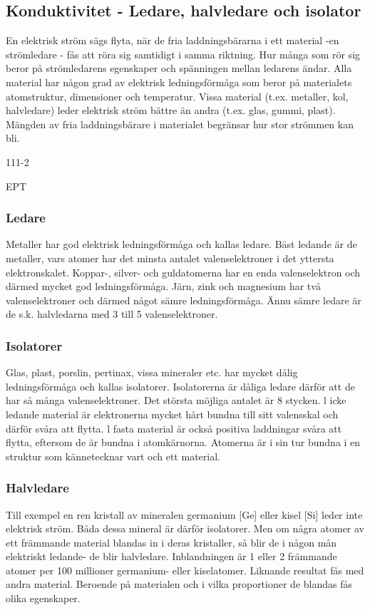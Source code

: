 \subsection{Konduktivitet - Ledare, halvledare och isolator}

En elektrisk ström sägs flyta, när de fria
laddningsbärarna i ett material -en strömledare - fås att röra sig samtidigt i samma
riktning. Hur många som rör sig beror på
strömledarens egenskaper och spänningen
mellan ledarens ändar.
Alla material har någon grad av elektrisk
ledningsförmåga som beror på materialets
atomstruktur, dimensioner och temperatur.
Vissa material (t.ex. metaller, kol, halvledare) leder elektrisk ström bättre än andra
(t.ex. glas, gummi, plast). Mängden av fria
laddningsbärare i materialet begränsar hur
stor strömmen kan bli.

111-2

EPT
\subsubsection{Ledare}
Metaller har god elektrisk ledningsförmåga
och kallas ledare. Bäst ledande är de metaller, vars atomer har det minsta antalet valenselektroner i det yttersta elektronskalet. Koppar-, silver- och guldatomerna har en enda
valenselektron och därmed mycket god ledningsförmåga. Järn, zink och magnesium
har två valenselektroner och därmed något
sämre ledningsförmåga. Ännu sämre ledare
är de s.k. halvledarna med 3 till 5 valenselektroner.

\subsubsection{Isolatorer}
Glas, plast, porslin, pertinax, vissa mineraler
etc. har mycket dålig ledningsförmåga och
kallas isolatorer. Isolatorerna är dåliga ledare därför att de har så många valenselektroner. Det största möjliga antalet är 8
stycken.
l icke ledande material är elektronerna
mycket hårt bundna till sitt valensskal och
därför svåra att flytta. l fasta material är
också positiva laddningar svåra att flytta,
eftersom de är bundna i atomkärnorna. Atomerna är i sin tur bundna i en struktur som
kännetecknar vart och ett material.

\subsubsection{Halvledare}
Till exempel en ren kristall av mineralen
germanium [Ge] eller kisel [Si] leder inte
elektrisk ström. Båda dessa mineral är därför isolatorer. Men om några atomer av ett
främmande material blandas in i deras kristaller, så blir de i någon mån elektriskt ledande- de blir halvledare. Inblandningen är
1 eller 2 främmande atomer per 100 millioner
germanium- eller kiselatomer. Liknande resultat fås med andra material. Beroende på
materialen och i vilka proportioner de blandas fås olika egenskaper.


